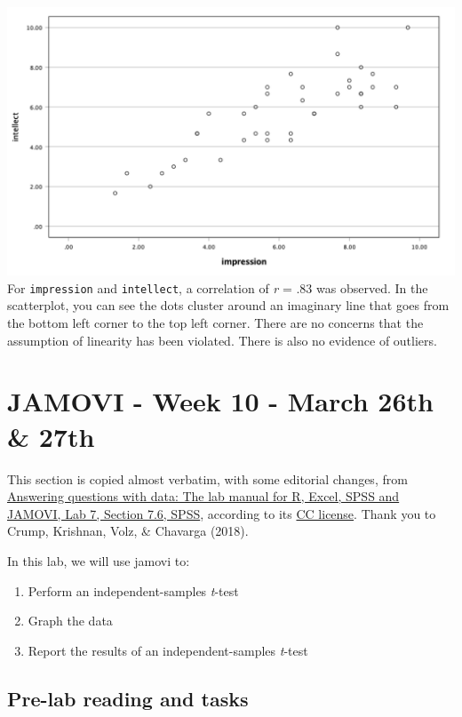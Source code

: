 \documentclass[
]{book}
\providecommand{\tightlist}{%
  \setlength{\itemsep}{0pt}\setlength{\parskip}{0pt}}
\begin{document}
\includegraphics{img/7.4.34.png}
For \texttt{impression} and \texttt{intellect}, a correlation of \emph{r} = .83 was observed. In the scatterplot, you can see the dots cluster around an imaginary line that goes from the bottom left corner to the top left corner. There are no concerns that the assumption of linearity has been violated. There is also no evidence of outliers.

\hypertarget{jamovi---week-10---march-26th-27th}{%
\section{JAMOVI - Week 10 - March 26th \& 27th}\label{jamovi---week-10---march-26th-27th}}

This section is copied almost verbatim, with some editorial changes, from \href{https://www.crumplab.com/statisticsLab/lab-7-t-test-independent-sample.html\#spss-7}{Answering questions with data: The lab manual for R, Excel, SPSS and JAMOVI, Lab 7, Section 7.6, SPSS}, according to its \href{https://creativecommons.org/licenses/by-sa/4.0/deed.ast}{CC license}. Thank you to Crump, Krishnan, Volz, \& Chavarga (2018).

In this lab, we will use jamovi to:

\begin{enumerate}
\def\labelenumi{\arabic{enumi}.}
\tightlist
\item
  Perform an independent-samples \emph{t}-test
\item
  Graph the data
\item
  Report the results of an independent-samples \emph{t}-test
\end{enumerate}

\hypertarget{pre-lab-reading-and-tasks}{%
\subsection{Pre-lab reading and tasks}\label{pre-lab-reading-and-tasks}}
\end{document}
